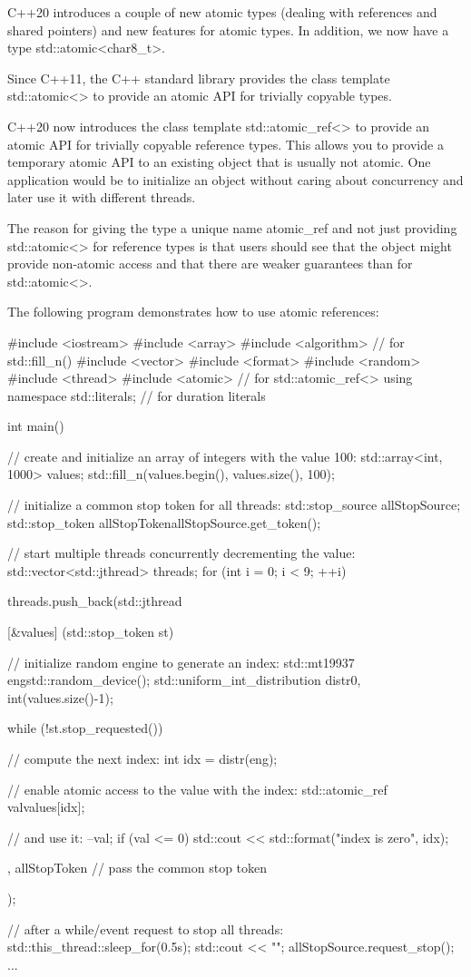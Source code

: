 

C++20 introduces a couple of new atomic types (dealing with references and shared pointers) and new features for atomic types. In addition, we now have a type std::atomic<char8\_t>.


Since C++11, the C++ standard library provides the class template std::atomic<> to provide an atomic API for trivially copyable types.

C++20 now introduces the class template std::atomic\_ref<> to provide an atomic API for trivially copyable reference types. This allows you to provide a temporary atomic API to an existing object that is usually not atomic. One application would be to initialize an object without caring about concurrency and later use it with different threads.

The reason for giving the type a unique name atomic\_ref and not just providing std::atomic<> for reference types is that users should see that the object might provide non-atomic access and that there are weaker guarantees than for std::atomic<>.


The following program demonstrates how to use atomic references:


\begin{cpp}
#include <iostream>
#include <array>
#include <algorithm> // for std::fill_n()
#include <vector>
#include <format>
#include <random>
#include <thread>
#include <atomic> // for std::atomic_ref<>
using namespace std::literals; // for duration literals

int main()
{
	// create and initialize an array of integers with the value 100:
	std::array<int, 1000> values;
	std::fill_n(values.begin(), values.size(), 100);
	
	// initialize a common stop token for all threads:
	std::stop_source allStopSource;
	std::stop_token allStopToken{allStopSource.get_token()};
	
	// start multiple threads concurrently decrementing the value:
	std::vector<std::jthread> threads;
	for (int i = 0; i < 9; ++i) {
		threads.push_back(std::jthread{
			[&values] (std::stop_token st) {
				// initialize random engine to generate an index:
				std::mt19937 eng{std::random_device{}()};
				std::uniform_int_distribution distr{0, int(values.size()-1)};
				
				while (!st.stop_requested()) {
					// compute the next index:
					int idx = distr(eng);
					
					// enable atomic access to the value with the index:
					std::atomic_ref val{values[idx]};
					
					// and use it:
					--val;
					if (val <= 0) {
						std::cout << std::format("index {} is zero\n", idx);
					}
				}
			},
			allStopToken // pass the common stop token
		});
	}
	
	// after a while/event request to stop all threads:
	std::this_thread::sleep_for(0.5s);
	std::cout << "\nSTOP\n";
	allStopSource.request_stop();
	...
}
\end{cpp}

